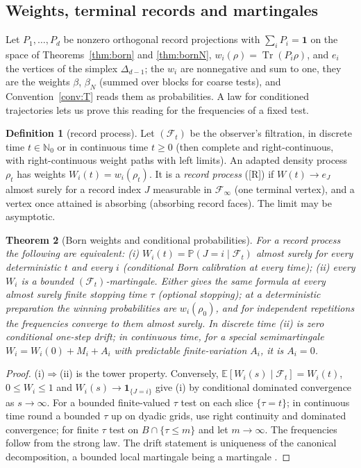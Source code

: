 \documentclass[aps,pra,onecolumn,superscriptaddress,nofootinbib,10pt]{revtex4-2}
\newtheorem{theorem}{Theorem}
\theoremstyle{definition}
\newtheorem{definition}[theorem]{Definition}
\theoremstyle{remark}
\newcommand{\tr}{\operatorname{Tr}}
\begin{document}
\subsection{Weights, terminal records and martingales}\label{sec:sorecords}
Let $P_1,\dots,P_d$ be nonzero orthogonal record projections with $\sum_iP_i=\mathbf1$ on the space of Theorems~\ref{thm:born} and
\ref{thm:bornN}, $w_i(\rho)=\tr(P_i\rho)$, and $e_i$ the vertices of the simplex $\Delta_{d-1}$; the $w_i$ are nonnegative and sum to
one, they are the weights $\beta$, $\beta_N$ (summed over blocks for coarse tests), and Convention~\ref{conv:T} reads
them as probabilities.  A law for conditioned trajectories lets us prove this reading for the
frequencies of a fixed test.

\begin{definition}[record process]\label{def:soprocess}
Let $(\mathcal F_t)$ be the observer's filtration, in discrete time $t\in\mathbb N_0$ or in continuous time $t\ge0$ (then complete and
right-continuous, with right-continuous weight paths with left limits).  An adapted density process $\rho_t$ has
weights $W_i(t)=w_i(\rho_t)$.  It is a \emph{record process} ([R]) if $W(t)\to e_J$ almost surely for a record index $J$
measurable in $\mathcal F_\infty$ (one terminal vertex), and a vertex once attained is absorbing (absorbing record
faces).  The limit may be asymptotic.
\end{definition}

\begin{theorem}[Born weights and conditional probabilities]\label{thm:sorigidity}
For a record process the following are equivalent:
(i) $W_i(t)=\mathbb P(J=i\mid\mathcal F_t)$ almost surely for every deterministic $t$ and every $i$ (conditional Born
calibration at every time); (ii) every $W_i$ is a bounded $(\mathcal F_t)$-martingale.
Either gives the same formula at every almost surely finite stopping time $\tau$ (optional stopping); at
a deterministic preparation the winning probabilities are $w_i(\rho_0)$, and for independent repetitions the
frequencies converge to them almost surely.  In discrete time (ii) is zero conditional one-step drift; in
continuous time, for a special semimartingale $W_i=W_i(0)+M_i+A_i$ with predictable finite-variation $A_i$, it is $A_i=0$.
\end{theorem}
\begin{proof}
(i)$\Rightarrow$(ii) is the tower property.  Conversely, $\mathbb E[W_i(s)\mid\mathcal F_t]=W_i(t)$, $0\le W_i\le1$ and $W_i(s)\to\mathbf1_{\{J=i\}}$ give (i)
by conditional dominated convergence as $s\to\infty$.  For a bounded finite-valued $\tau$ test on each slice $\{\tau=t\}$;
in continuous time round a bounded $\tau$ up on dyadic grids, use right continuity and dominated
convergence; for finite $\tau$ test on $B\cap\{\tau\le m\}$ and let $m\to\infty$.  The frequencies follow from the strong
law.  The drift statement is uniqueness of the canonical decomposition, a bounded local martingale
being a martingale \cite{n3:Williams}.
\end{proof}
\end{document}
